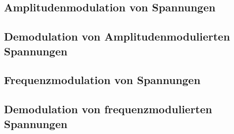 \subsection{Amplitudenmodulation von Spannungen}

















\subsection{Demodulation von Amplitudenmodulierten Spannungen}









\subsection{Frequenzmodulation von Spannungen}





\subsection{Demodulation von frequenzmodulierten Spannungen}


